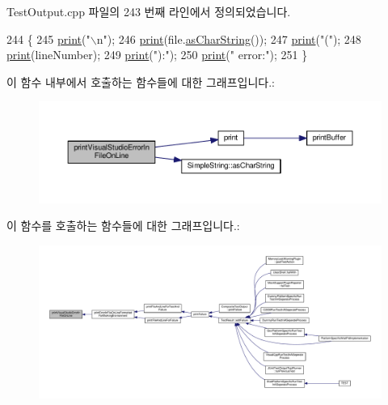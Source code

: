 Test\+Output.\+cpp 파일의 243 번째 라인에서 정의되었습니다.


\begin{DoxyCode}
244 \{
245     \hyperlink{class_test_output_a321b5c489a90374cb61c34fe5d2253ef}{print}(\textcolor{stringliteral}{"\(\backslash\)n"});
246     \hyperlink{class_test_output_a321b5c489a90374cb61c34fe5d2253ef}{print}(file.\hyperlink{class_simple_string_af7c0efaf31f42553f05719903c830be1}{asCharString}());
247     \hyperlink{class_test_output_a321b5c489a90374cb61c34fe5d2253ef}{print}(\textcolor{stringliteral}{"("});
248     \hyperlink{class_test_output_a321b5c489a90374cb61c34fe5d2253ef}{print}(lineNumber);
249     \hyperlink{class_test_output_a321b5c489a90374cb61c34fe5d2253ef}{print}(\textcolor{stringliteral}{"):"});
250     \hyperlink{class_test_output_a321b5c489a90374cb61c34fe5d2253ef}{print}(\textcolor{stringliteral}{" error:"});
251 \}
\end{DoxyCode}


이 함수 내부에서 호출하는 함수들에 대한 그래프입니다.\+:
\nopagebreak
\begin{figure}[H]
\begin{center}
\leavevmode
\includegraphics[width=350pt]{class_test_output_a0a0136e850e6b9a696ab84e5c416341a_cgraph}
\end{center}
\end{figure}




이 함수를 호출하는 함수들에 대한 그래프입니다.\+:
\nopagebreak
\begin{figure}[H]
\begin{center}
\leavevmode
\includegraphics[width=350pt]{class_test_output_a0a0136e850e6b9a696ab84e5c416341a_icgraph}
\end{center}
\end{figure}



